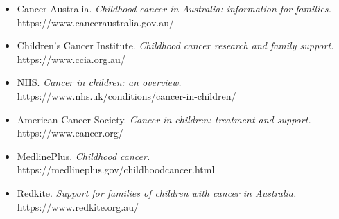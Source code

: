 \begin{itemize}
    \item Cancer Australia. \textit{Childhood cancer in Australia: information for families.} https://www.canceraustralia.gov.au/
    \item Children's Cancer Institute. \textit{Childhood cancer research and family support.} https://www.ccia.org.au/
    \item NHS. \textit{Cancer in children: an overview.} https://www.nhs.uk/conditions/cancer-in-children/
    \item American Cancer Society. \textit{Cancer in children: treatment and support.} https://www.cancer.org/
    \item MedlinePlus. \textit{Childhood cancer.} https://medlineplus.gov/childhoodcancer.html
    \item Redkite. \textit{Support for families of children with cancer in Australia.} https://www.redkite.org.au/
\end{itemize}
